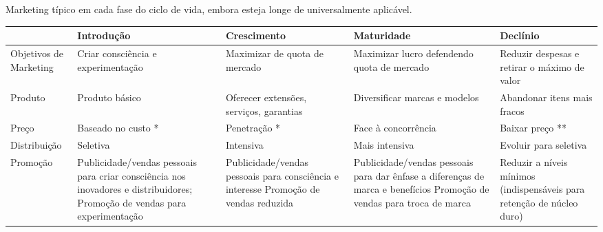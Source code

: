 \documentclass[11pt]{article}
\begin{document}
Marketing típico em cada fase do ciclo de vida, embora esteja longe de universalmente aplicável.

\begin{tabular}{ C{2.1cm} | C{3.3cm} | C{3.3cm} | C{3.3cm} | C{3.3cm} }
                           & Introdução                                                                                                                 & Crescimento                                                                          & Maturidade                                                                                                            & Declínio                                                                \\\hline
    Objetivos de Marketing & Criar consciência e experimentação                                                                                         & Maximizar de quota de mercado                                                        & Maximizar lucro defendendo quota de mercado                                                                           & Reduzir despesas e retirar o máximo de valor                            \\\hline
    Produto                & Produto básico                                                                                                             & Oferecer extensões, serviços, garantias                                              & Diversificar marcas e modelos                                                                                         & Abandonar itens mais fracos                                             \\\hline
    Preço                  & Baseado no custo *                                                                                                         & Penetração *                                                                         & Face à concorrência                                                                                                   & Baixar preço **                                                         \\\hline
    Distribuição           & Seletiva                                                                                                                   & Intensiva                                                                            & Mais intensiva                                                                                                        & Evoluir para seletiva                                                   \\\hline
    Promoção               & Publicidade/vendas pessoais para criar consciência nos inovadores e distribuidores; Promoção de vendas para experimentação & Publicidade/vendas pessoais para consciência e interesse Promoção de vendas reduzida & Publicidade/vendas pessoais para dar ênfase a diferenças de marca e benefícios Promoção de vendas para troca de marca & Reduzir a níveis mínimos (indispensáveis para retenção de núcleo  duro) \\
\end{tabular}
\end{document}
